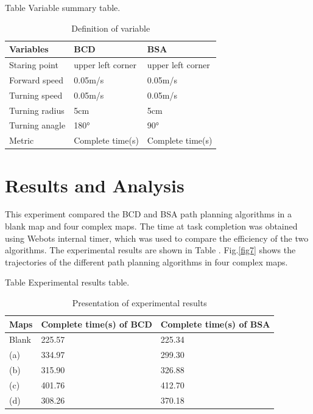 \documentclass[conference]{IEEEtran}
\begin{document}
Table \uppercase\expandafter{} Variable summary table.
\begin{table}[htbp]
\centering
\setlength{\abovecaptionskip}{0.cm}
\caption{Definition of variable}
\label{Table1}
\begin{tabular}{lll}
\hline
Variables      & BCD               & BSA               \\\hline
Staring point  & upper left corner & upper left corner \\
Forward speed  & 0.05m/s           & 0.05m/s           \\
Turning speed  & 0.05m/s           & 0.05m/s           \\
Turning radius & 5cm               & 5cm               \\
Turning anagle & 180°              & 90°               \\
Metric         & Complete time(s)  & Complete time(s)  \\\hline
\end{tabular}
\end{table}


\section{Results and Analysis}



This experiment compared the BCD and BSA path planning algorithms in a blank map and four complex maps. The time at task completion was obtained using Webots internal timer, which was used to compare the efficiency of the two algorithms. The experimental results are shown in Table \uppercase\expandafter{}. Fig.\ref{fig7} shows the trajectories of the different path planning algorithms in four complex maps. 

Table \uppercase\expandafter{} Experimental results table.
\begin{table}[htbp]
\centering
\setlength{\abovecaptionskip}{0.cm}
\caption{Presentation of experimental results}
\label{Table1}
\begin{tabular}{lll}
\hline
Maps  & Complete time(s) of BCD & Complete time(s) of BSA \\\hline
Blank & 225.57                  & 225.34                  \\
(a)   & 334.97                  & 299.30                  \\
(b)   & 315.90                  & 326.88                  \\
(c)   & 401.76                  & 412.70                  \\
(d)   & 308.26                  & 370.18                  \\\hline
\end{tabular}
\end{table}
\end{document}
